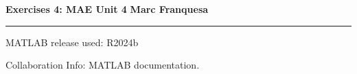 \documentclass[a4paper,12pt]{report}
\begin{document}
{\Large{\textbf{Exercises 4: MAE Unit 4}} \hfill \textbf{Marc Franquesa}}
\hrule
\vspace{0.5cm}

MATLAB release used: R2024b

Collaboration Info: MATLAB documentation.

\bigskip

\begin{exlist}
    
\end{exlist}
\end{document}
